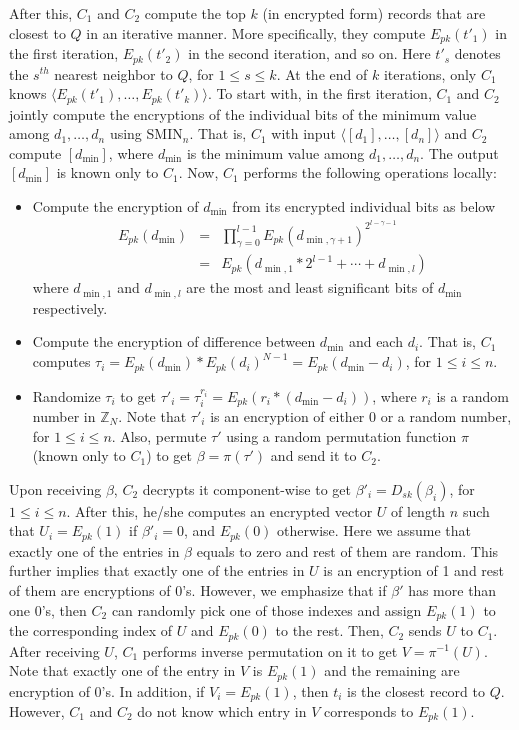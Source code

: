 \documentclass{article}
\begin{document}
After this, $C_1$ and $C_2$ compute the top $k$ (in encrypted form) records that are 
closest to $Q$ in an iterative manner. More specifically, they compute 
$E_{pk}(t'_1)$ in the first iteration, $E_{pk}(t'_2)$ in the second iteration, and so on. Here $t'_s$ denotes 
the $s^{th}$ nearest neighbor to $Q$, for $1 \le s \le k$. At the end of 
$k$ iterations, only $C_1$ knows $\langle E_{pk}(t'_1), \ldots, E_{pk}(t'_k)\rangle$. 
To start with, in the first iteration, $C_1$ and $C_2$ jointly compute the encryptions 
of the individual bits of the minimum value among $d_1,\ldots, d_n$ using 
SMIN$_n$. That is, $C_1$ with input $\langle [d_1], \ldots, [d_n]\rangle$ 
and $C_2$ compute $[d_{\min}]$, where $d_{\min}$ is the minimum value 
among $d_1,\ldots, d_n$. The output $[d_{\min}]$ is known only to $C_1$. Now, $C_1$ performs 
the following operations locally:
\begin{itemize}
\item Compute the encryption of $d_{\min}$ from its encrypted individual bits as below 
\begin{eqnarray*}
E_{pk}(d_{\min}) &=& \prod_{\gamma=0}^{l-1} E_{pk}(d_{\min,\gamma+1})^{2^{l-\gamma -1}} \\
               &=& E_{pk}(d_{\min,1}\ast 2^{l-1} + \cdots + d_{\min, l})
\end{eqnarray*}
where $d_{\min,1}$ and $d_{\min,l}$ are the most and least significant bits of $d_{\min}$ respectively.
\item Compute the encryption of difference between $d_{\min}$ and each $d_i$. That is, 
$C_1$ computes $\tau_i = E_{pk}(d_{\min})\ast E_{pk}(d_i)^{N-1} = E_{pk}(d_{\min} - d_i)$, for $1 \le i \le n$. 
\item Randomize $\tau_i$ to get $\tau'_i = \tau_i^{r_i} = E_{pk}(r_i\ast(d_{\min} - d_i))$, where 
$r_i$ is a random number in $\mathbb{Z}_N$. Note that $\tau'_i$ is an encryption of 
either 0 or a random number, for $1 \le i \le n$. Also, permute $\tau'$ using a 
random permutation function $\pi$ (known only to $C_1$) to get $\beta = \pi(\tau')$ and 
send it to $C_2$.
\end{itemize} 
Upon receiving $\beta$, $C_2$ decrypts it component-wise to get $\beta'_i = D_{sk}(\beta_i)$, 
for $1 \le i \le n$. After this, he/she computes an encrypted vector $U$ of length $n$ 
such that $U_i = E_{pk}(1)$ if $\beta'_i=0$, and $E_{pk}(0)$ otherwise. Here we assume that 
exactly one of the entries in $\beta$ equals to zero and rest of them are random. This further 
implies that exactly one of the entries in $U$ is an encryption of 1 and 
rest of them are encryptions of 0's. However, we emphasize that if $\beta'$ has more than one 0's, 
then $C_2$ can randomly pick one of those indexes and 
assign $E_{pk}(1)$ to the corresponding index of $U$ and $E_{pk}(0)$ to the rest. Then, $C_2$ sends $U$ to $C_1$. 
After receiving $U$, $C_1$ performs inverse permutation on it to get 
$V = \pi^{-1}(U)$. Note that exactly one of the entry in $V$ is $E_{pk}(1)$ and the remaining are 
encryption of 0's. In addition, if $V_i = E_{pk}(1)$, then $t_i$ is the closest record 
to $Q$. However, $C_1$ and $C_2$ do not know which entry in $V$ corresponds 
to $E_{pk}(1)$. 
\end{document}
